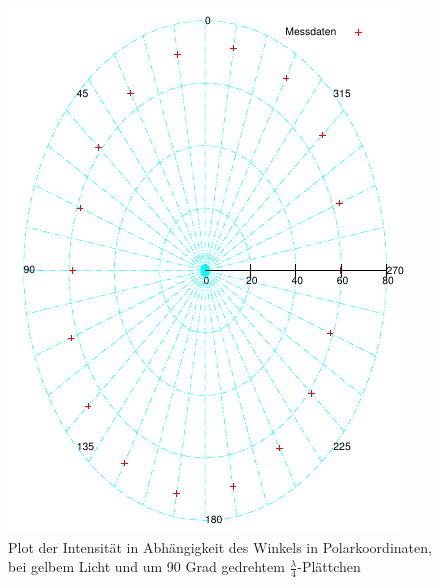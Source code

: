 \documentclass[12pt]{scrartcl}
\begin{document}
\begin{enumerate}
\begin{figure}[H]
\centering
    \includegraphics[scale = 1]{a_5_c.pdf}
  	\caption[Plot der Intensität in Abhängigkeit des Winkels in Polarkoordinaten, bei gelbem Licht und um 90 Grad gedrehtem $\frac{\lambda}{4}$-Plättchen]{Plot der Intensität in Abhängigkeit des Winkels in Polarkoordinaten, bei gelbem Licht und um 90 Grad gedrehtem $\frac{\lambda}{4}$-Plättchen}
  \label{fig:a_5_c}
\end{figure}



\end{enumerate}
\end{document}
